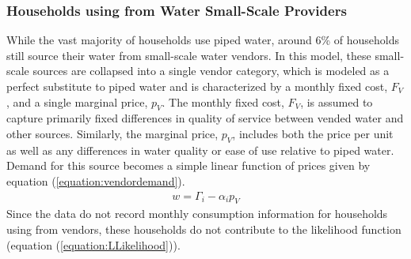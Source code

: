 \documentclass[12pt]{article}
\begin{document}
\subsubsection{Households using from Water Small-Scale Providers}

While the vast majority of households use piped water, around 6\unskip\% of households still source their water from small-scale water vendors.  In this model, these small-scale sources are collapsed into a single vendor category, which is modeled as a perfect substitute to piped water and is characterized by a monthly fixed cost, $F_V$, and a single marginal price, $p_V$.  The monthly fixed cost, $F_V$, is assumed to capture primarily fixed differences in quality of service between vended water and other sources.  Similarly, the marginal price, $p_V$, includes both the price per unit as well as any differences in water quality or ease of use relative to piped water.  Demand for this source becomes a simple linear function of prices given by equation (\ref{equation:vendordemand}).
\begin{align}\label{equation:vendordemand}
w = \Gamma_i - \alpha_i p_V
\end{align}
Since the data do not record monthly consumption information for households using from vendors, these households do not contribute to the likelihood function (equation (\ref{equation:LLikelihood})).  
\end{document}
